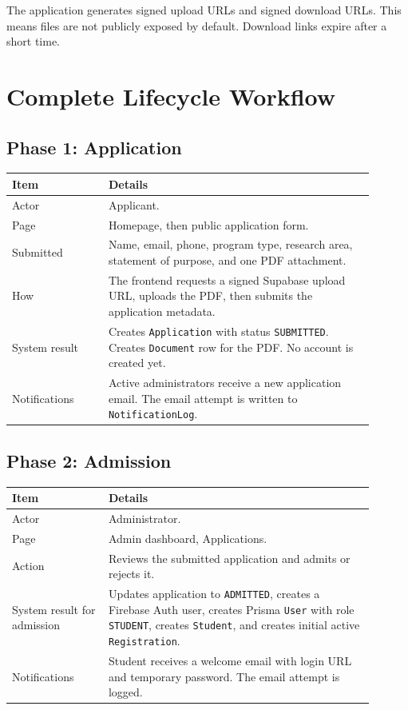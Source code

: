 \documentclass[11pt,a4paper]{article}
\newcommand{\status}[1]{\texttt{#1}}
\newcommand{\code}[1]{\texttt{#1}}
\begin{document}
The application generates signed upload URLs and signed download URLs. This means files are not publicly exposed by default. Download links expire after a short time.

\section{Complete Lifecycle Workflow}

\subsection{Phase 1: Application}

\begin{longtable}{p{0.24\linewidth} p{0.66\linewidth}}
\toprule
\textbf{Item} & \textbf{Details} \\
\midrule
Actor & Applicant. \\
Page & Homepage, then public application form. \\
Submitted & Name, email, phone, program type, research area, statement of purpose, and one PDF attachment. \\
How & The frontend requests a signed Supabase upload URL, uploads the PDF, then submits the application metadata. \\
System result & Creates \code{Application} with status \status{SUBMITTED}. Creates \code{Document} row for the PDF. No account is created yet. \\
Notifications & Active administrators receive a new application email. The email attempt is written to \code{NotificationLog}. \\
\bottomrule
\end{longtable}

\subsection{Phase 2: Admission}

\begin{longtable}{p{0.24\linewidth} p{0.66\linewidth}}
\toprule
\textbf{Item} & \textbf{Details} \\
\midrule
Actor & Administrator. \\
Page & Admin dashboard, Applications. \\
Action & Reviews the submitted application and admits or rejects it. \\
System result for admission & Updates application to \status{ADMITTED}, creates a Firebase Auth user, creates Prisma \code{User} with role \status{STUDENT}, creates \code{Student}, and creates initial active \code{Registration}. \\
Notifications & Student receives a welcome email with login URL and temporary password. The email attempt is logged. \\
\bottomrule
\end{longtable}
\end{document}
